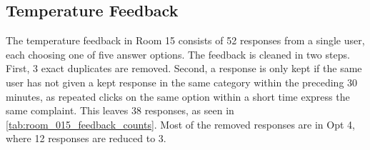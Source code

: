 \subsection{Temperature Feedback}
The temperature feedback in Room 15 consists of 52 responses from a single user, each choosing one of five answer options.
The feedback is cleaned in two steps. First, 3 exact duplicates are removed. Second, a response is only kept if the same user
has not given a kept response in the same category within the preceding 30 minutes, as repeated clicks on the same option
within a short time express the same complaint. This leaves 38 responses, as seen in \cref{tab:room_015_feedback_counts}.
Most of the removed responses are in Opt 4, where 12 responses are reduced to 3.



%
% 
